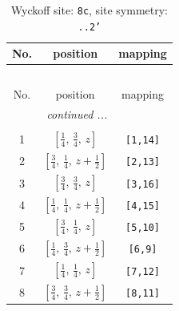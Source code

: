 \documentclass[fleqn,8pt]{jsarticle}
\begin{document}
\renewcommand{\arraystretch}{1.2}
\begin{longtable}{ccc}
\caption{Wyckoff site: {\tt 8c}, site symmetry: {\tt ..2'}}
 \\
 \hline \hline
No. & position & mapping \\ \hline \endfirsthead

\multicolumn{2}{l}{\tablename\ \thetable{}} \\
 \hline \hline
No. & position & mapping \\ \hline \endhead

 \hline \hline
\multicolumn{2}{r}{\footnotesize\it continued ...} \\ \endfoot

 \hline \hline
\multicolumn{2}{r}{} \\ \endlastfoot

1 & $\left[ \frac{1}{4},\, \frac{3}{4},\, z \right]$ & {\tt [1,14]} \\ \hline
2 & $\left[ \frac{3}{4},\, \frac{1}{4},\, z + \frac{1}{2} \right]$ & {\tt [2,13]} \\ \hline
3 & $\left[ \frac{3}{4},\, \frac{3}{4},\, z \right]$ & {\tt [3,16]} \\ \hline
4 & $\left[ \frac{1}{4},\, \frac{1}{4},\, z + \frac{1}{2} \right]$ & {\tt [4,15]} \\ \hline
5 & $\left[ \frac{3}{4},\, \frac{1}{4},\, z \right]$ & {\tt [5,10]} \\ \hline
6 & $\left[ \frac{1}{4},\, \frac{3}{4},\, z + \frac{1}{2} \right]$ & {\tt [6,9]} \\ \hline
7 & $\left[ \frac{1}{4},\, \frac{1}{4},\, z \right]$ & {\tt [7,12]} \\ \hline
8 & $\left[ \frac{3}{4},\, \frac{3}{4},\, z + \frac{1}{2} \right]$ & {\tt [8,11]} \\
\end{longtable}
\renewcommand{\arraystretch}{1.2}
\end{document}
